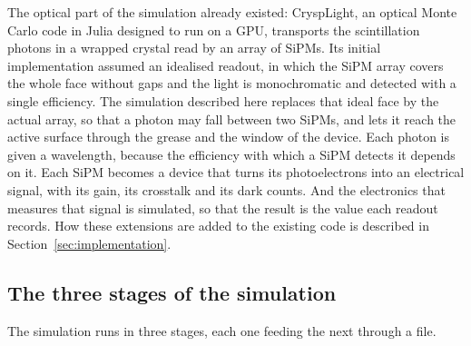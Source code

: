 \documentclass[11pt]{article}
\begin{document}
The optical part of the simulation already existed: CryspLight, an optical
Monte Carlo code in Julia designed to run on a GPU, transports the
scintillation photons in a wrapped crystal read by an array of SiPMs. Its
initial implementation assumed an idealised readout, in which the SiPM array
covers the whole face without gaps and the light is monochromatic and
detected with a single efficiency. The simulation described here replaces
that ideal face by the actual array, so that a photon may fall between two
SiPMs, and lets it reach the active surface through the grease and the
window of the device. Each photon is given a wavelength, because the
efficiency with which a SiPM detects it depends on it. Each SiPM becomes a
device that turns its photoelectrons into an electrical signal, with its
gain, its crosstalk and its dark counts. And the electronics that measures
that signal is simulated, so that the result is the value each readout
records. How these extensions are added to the existing code is described in
Section~\ref{sec:implementation}.

\subsection{The three stages of the simulation}

The simulation runs in three stages, each one feeding the next through a
file.
\end{document}
